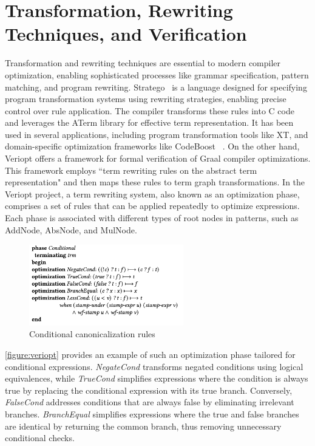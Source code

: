 \section{Transformation, Rewriting Techniques, and Verification}
Transformation and rewriting techniques are essential to modern compiler optimization, enabling sophisticated processes like grammar specification, pattern matching, and program rewriting. Stratego~\cite{Eelco2001} is a language designed for specifying program transformation systems using rewriting strategies, enabling precise control over rule application. The compiler transforms these rules into C code and leverages the ATerm library for effective term representation. It has been used in several applications, including program transformation tools like XT, and domain-specific optimization frameworks like CodeBoost ~\cite{Eelco2001}. On the other hand, Veriopt \cite{Webb2023} offers a framework for formal verification of Graal compiler optimizations. This framework employs  ``term rewriting rules on the abstract term representation" \cite{Webb2023} and then maps these rules to term graph transformations. In the Veriopt project, a term rewriting system, also known as an optimization phase, comprises a set of rules that can be applied repeatedly to optimize expressions. Each phase is associated with different types of root nodes in patterns, such as AddNode, AbsNode, and MulNode. 

\begin{figure}[h]
    \centering
    \includegraphics[width=0.6\textwidth]{Packages/veriopt.png}
    \caption{Conditional canonicalization rules \cite{Webb2023}}
    \label{figure:veriopt}
\end{figure}

\autoref{figure:veriopt} provides an example of such an optimization phase tailored for conditional expressions. \textit{NegateCond} transforms negated conditions using logical equivalences, while \textit{TrueCond} simplifies expressions where the condition is always true by replacing the conditional expression with its true branch. Conversely, \textit{FalseCond} addresses conditions that are always false by eliminating irrelevant branches. \textit{BranchEqual} simplifies expressions where the true and false branches are identical by returning the common branch, thus removing unnecessary conditional checks.

